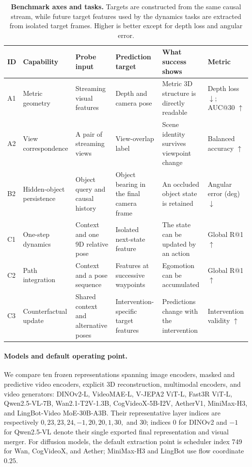 \begin{table}[t]
  \centering
  \caption{\textbf{Benchmark axes and tasks.}  Targets are constructed from the
  same causal stream, while future target features used by the dynamics tasks
  are extracted from isolated target frames.  Higher is better except for depth
  loss and angular error.}
  \label{tab:benchmark-tasks}
  \small
  \begin{tabularx}{\textwidth}{@{}llXXXl@{}}
    \toprule
    ID & Capability & Probe input & Prediction target & What success shows & Metric \\
    \midrule
    A1 & Metric geometry & Streaming visual features & Depth and camera pose &
      Metric 3D structure is directly readable & Depth loss $\downarrow$; AUC@30 $\uparrow$ \\
    A2 & View correspondence & A pair of streaming views & View-overlap label &
      Scene identity survives viewpoint change & Balanced accuracy $\uparrow$ \\
    B2 & Hidden-object persistence & Object query and causal history &
      Object bearing in the final camera frame & An occluded object state is retained &
      Angular error (deg) $\downarrow$ \\
    C1 & One-step dynamics & Context and one 9D relative pose &
      Isolated next-state feature & The state can be updated by an action &
      Global R@1 $\uparrow$ \\
    C2 & Path integration & Context and a pose sequence &
      Features at successive waypoints & Egomotion can be accumulated &
      Global R@1 $\uparrow$ \\
    C3 & Counterfactual update & Shared context and alternative poses &
      Intervention-specific target features & Predictions change with the intervention &
      Intervention validity $\uparrow$ \\
    \bottomrule
  \end{tabularx}
\end{table}

\paragraph{Models and default operating point.}
We compare ten frozen representations spanning image encoders, masked and
predictive video encoders, explicit 3D reconstruction, multimodal encoders, and
video generators: DINOv2-L, VideoMAE-L, V-JEPA2 ViT-L, Fast3R ViT-L,
Qwen2.5-VL-7B, Wan2.1-T2V-1.3B, CogVideoX-5B-I2V, AetherV1, MiniMax-H3, and
LingBot-Video MoE-30B-A3B.  Their representative layer indices are respectively
$0,23,23,24,-1,20,20,1,30,$ and $30$; indices $0$ for DINOv2 and $-1$ for
Qwen2.5-VL denote their single exported final representation and visual merger.
For diffusion models, the default extraction point is scheduler index 749 for
Wan, CogVideoX, and Aether; MiniMax-H3 and LingBot use flow coordinate $0.25$.

